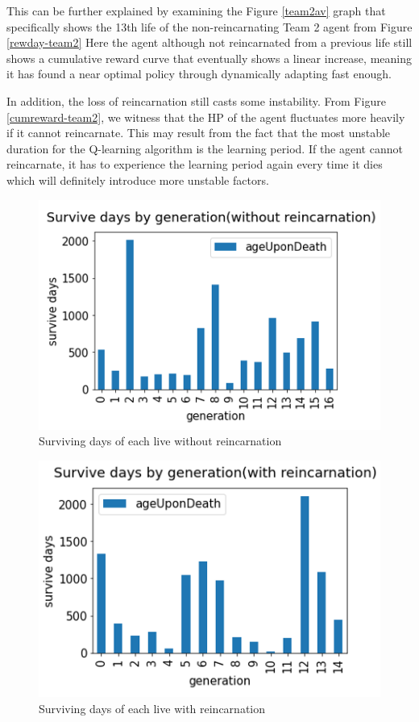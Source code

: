 This can be further explained by examining the Figure \ref{team2av} graph that specifically shows the 13th life of the non-reincarnating Team 2 agent from Figure \ref{rewday-team2} Here the agent although not reincarnated from a previous life still shows a cumulative reward curve that eventually shows a linear increase, meaning it has found a near optimal policy through dynamically adapting fast enough.

In addition, the loss of reincarnation still casts some instability. From Figure \ref{cumreward-team2}, we witness that the HP of the agent fluctuates more heavily if it cannot reincarnate. This may result from the fact that the most unstable duration for the Q-learning algorithm is the learning period. If the agent cannot reincarnate, it has to experience the learning period again every time it dies which will definitely introduce more unstable factors. 

\begin{figure}
\centering
\includegraphics{004_team_2_agent_design/suvdayworein}
\caption{Surviving days of each live without reincarnation}
\end{figure}

\begin{figure}
\centering
\includegraphics{004_team_2_agent_design/suvdaywrein}
\caption{Surviving days of each live with reincarnation}
\end{figure}

